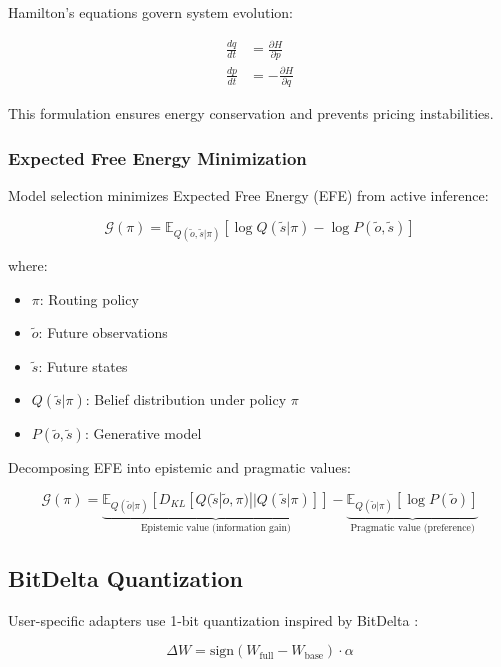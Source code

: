 Hamilton's equations govern system evolution:

\begin{align}
\frac{dq}{dt} &= \frac{\partial H}{\partial p} \\
\frac{dp}{dt} &= -\frac{\partial H}{\partial q}
\end{align}

This formulation ensures energy conservation and prevents pricing instabilities.

\subsubsection{Expected Free Energy Minimization}

Model selection minimizes Expected Free Energy (EFE) from active inference:

\begin{equation}
\mathcal{G}(\pi) = \mathbb{E}_{Q(\tilde{o}, \tilde{s}|\pi)} \left[ \log Q(\tilde{s}|\pi) - \log P(\tilde{o}, \tilde{s}) \right]
\end{equation}

where:
\begin{itemize}
\item $\pi$: Routing policy
\item $\tilde{o}$: Future observations
\item $\tilde{s}$: Future states
\item $Q(\tilde{s}|\pi)$: Belief distribution under policy $\pi$
\item $P(\tilde{o}, \tilde{s})$: Generative model
\end{itemize}

Decomposing EFE into epistemic and pragmatic values:

\begin{equation}
\mathcal{G}(\pi) = \underbrace{\mathbb{E}_{Q(\tilde{o}|\pi)}[D_{KL}[Q(\tilde{s}|\tilde{o}, \pi)||Q(\tilde{s}|\pi)]]}_{\text{Epistemic value (information gain)}} - \underbrace{\mathbb{E}_{Q(\tilde{o}|\pi)}[\log P(\tilde{o})]}_{\text{Pragmatic value (preference)}}\end{equation}

\subsection{BitDelta Quantization}

User-specific adapters use 1-bit quantization inspired by BitDelta \cite{bitdelta}:

\begin{equation}
\Delta W = \text{sign}(W_{\text{full}} - W_{\text{base}}) \cdot \alpha
\end{equation}


